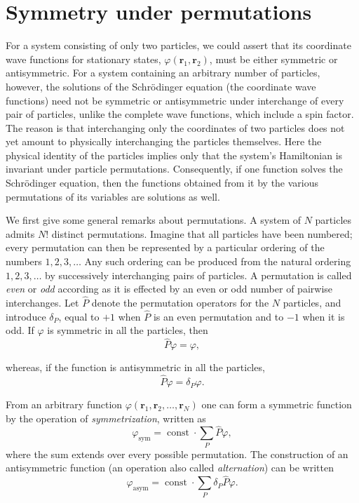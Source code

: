 \section{Symmetry under permutations}

For a system consisting of only two particles, we could assert that its coordinate wave functions for stationary states, $\varphi(\mathbf r_1,\mathbf r_2)$, must be either symmetric or antisymmetric. For a system containing an arbitrary number of particles, however, the solutions of the Schrödinger equation (the coordinate wave functions) need not be symmetric or antisymmetric under interchange of every pair of particles, unlike the complete wave functions, which include a spin factor. The reason is that interchanging only the coordinates of two particles does not yet amount to physically interchanging the particles themselves. Here the physical identity of the particles implies only that the system's Hamiltonian is invariant under particle permutations. Consequently, if one function solves the Schrödinger equation, then the functions obtained from it by the various permutations of its variables are solutions as well.

We first give some general remarks about permutations. A system of $N$ particles admits $N!$ distinct permutations. Imagine that all particles have been numbered; every permutation can then be represented by a particular ordering of the numbers $1,2,3,\ldots$ Any such ordering can be produced from the natural ordering $1,2,3,\ldots$ by successively interchanging pairs of particles. A permutation is called \emph{even} or \emph{odd} according as it is effected by an even or odd number of pairwise interchanges. Let $\widehat P$ denote the permutation operators for the $N$ particles, and introduce $\delta_P$, equal to $+1$ when $\widehat P$ is an even permutation and to $-1$ when it is odd. If $\varphi$ is symmetric in all the particles, then
\[
 \widehat P\varphi=\varphi,
\]

whereas, if the function is antisymmetric in all the particles,
\[
 \widehat P\varphi=\delta_P\varphi.
\]

From an arbitrary function $\varphi(\mathbf r_1,\mathbf r_2,\ldots,\mathbf r_N)$ one can form a symmetric function by the operation of \emph{symmetrization}, written as
\begin{equation}
 \varphi_{\mathrm{sym}}=\operatorname{const}\cdot\sum_P\widehat P\varphi,
 \tag{63.1}
\end{equation}
where the sum extends over every possible permutation. The construction of an antisymmetric function (an operation also called \emph{alternation}) can be written
\begin{equation}
 \varphi_{\mathrm{asym}}=\operatorname{const}\cdot\sum_P\delta_P\widehat P\varphi.
 \tag{63.2}
\end{equation}


